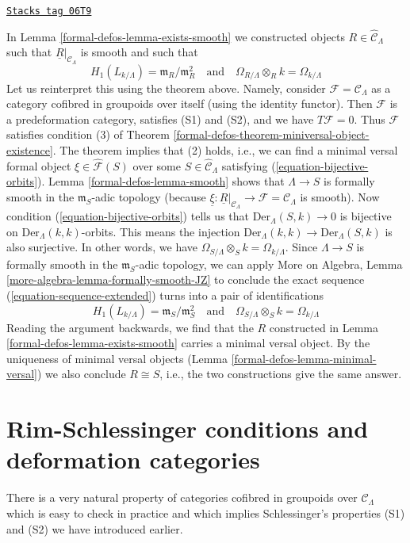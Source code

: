 \begin{example}
\label{formal-defos-example-smooth-continued}
\href{https://stacks.math.columbia.edu/tag/06T9}{\texttt{Stacks tag 06T9}}

In Lemma \ref{formal-defos-lemma-exists-smooth} we constructed objects
$R \in \widehat{\mathcal{C}}_\Lambda$ such that
$\underline{R}|_{\mathcal{C}_\Lambda}$ is smooth
and such that
$$
H_1(L_{k/\Lambda}) = \mathfrak m_R/\mathfrak m_R^2
\quad\text{and}\quad
\Omega_{R/\Lambda} \otimes_R k = \Omega_{k/\Lambda}
$$
Let us reinterpret this using the theorem above. Namely,
consider $\mathcal{F} = \mathcal{C}_\Lambda$
as a category cofibred in groupoids over itself
(using the identity functor).
Then $\mathcal{F}$ is a predeformation category,
satisfies (S1) and (S2), and we have $T\mathcal{F} = 0$.
Thus $\mathcal{F}$ satisfies condition (3) of
Theorem \ref{formal-defos-theorem-miniversal-object-existence}.
The theorem implies that (2) holds, i.e.,
we can find a minimal versal formal object
$\xi \in \widehat{\mathcal{F}}(S)$
over some $S \in \widehat{\mathcal{C}}_\Lambda$
satisfying (\ref{equation-bijective-orbits}).
Lemma \ref{formal-defos-lemma-smooth} shows that
$\Lambda \to S$ is formally smooth in the $\mathfrak m_S$-adic
topology (because
$\underline{\xi} : \underline{R}|_{\mathcal{C}_\Lambda} \to
\mathcal{F} = \mathcal{C}_\Lambda$ is smooth).
Now condition (\ref{equation-bijective-orbits})
tells us that $\text{Der}_\Lambda(S, k) \to 0$ is bijective on
$\text{Der}_\Lambda(k, k)$-orbits. This means the injection
$\text{Der}_\Lambda(k, k) \to \text{Der}_\Lambda(S, k)$ is also surjective.
In other words, we have
$\Omega_{S/\Lambda} \otimes_S k = \Omega_{k/\Lambda}$.
Since $\Lambda \to S$ is formally smooth in the $\mathfrak m_S$-adic
topology, we can apply More on Algebra, Lemma
\ref{more-algebra-lemma-formally-smooth-JZ}
to conclude the exact sequence (\ref{equation-sequence-extended})
turns into a pair of identifications
$$
H_1(L_{k/\Lambda}) = \mathfrak m_S/\mathfrak m_S^2
\quad\text{and}\quad
\Omega_{S/\Lambda} \otimes_S k = \Omega_{k/\Lambda}
$$
Reading the argument backwards, we find that the $R$ constructed
in Lemma \ref{formal-defos-lemma-exists-smooth} carries a minimal versal object.
By the uniqueness of minimal versal objects
(Lemma \ref{formal-defos-lemma-minimal-versal})
we also conclude $R \cong S$, i.e., the two constructions give
the same answer.
\end{example}

\section{Rim-Schlessinger conditions and deformation categories}
\label{formal-defos-section-RS-condition}
There is a very natural property of categories cofibred in groupoids
over $\mathcal{C}_\Lambda$ which is easy to check in practice
and which implies Schlessinger's properties (S1) and (S2) we
have introduced earlier.

